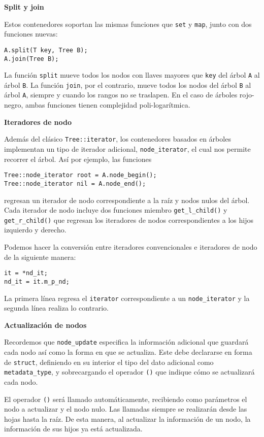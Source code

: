 \documentclass[10pt, letterpaper, twoside]{article}
\begin{document}
\textbf{Split y join}

Estos contenedores soportan las mismas funciones que \texttt{set} y \texttt{map}, junto con dos funciones nuevas: 

\begin{lstlisting}
A.split(T key, Tree B);
A.join(Tree B);
\end{lstlisting}

La función \texttt{split} mueve todos los nodos con llaves mayores que \texttt{key} del árbol \texttt{A} al árbol \texttt{B}. La función \texttt{join}, por el contrario, mueve todos los nodos del árbol \texttt{B} al árbol \texttt{A}, siempre y cuando los rangos no se traslapen. En el caso de árboles rojo-negro, ambas funciones tienen complejidad poli-logarítmica.\medskip

\textbf{Iteradores de nodo}

Además del clásico \texttt{Tree::iterator}, los contenedores basados en árboles implementan un tipo de iterador adicional, \texttt{node\_iterator}, el cual nos permite recorrer el árbol. Así por ejemplo, las funciones
\begin{lstlisting}
Tree::node_iterator root = A.node_begin();
Tree::node_iterator nil = A.node_end();
\end{lstlisting}
regresan un iterador de nodo correspondiente a la raíz y nodos nulos del árbol. Cada iterador de nodo incluye dos funciones miembro \texttt{get\_l\_child()} y \texttt{get\_r\_child()} que regresan los iteradores de nodos correspondientes a los hijos izquierdo y derecho.

Podemos hacer la conversión entre iteradores convencionales e iteradores de nodo de la siguiente manera:
\begin{lstlisting}
it = *nd_it;
nd_it = it.m_p_nd;
\end{lstlisting}
La primera línea regresa el \texttt{iterator} correspondiente a un \texttt{node\_iterator} y la segunda línea realiza lo contrario.\medskip

\textbf{Actualización de nodos}

Recordemos que \texttt{node\_update} especifica la información adicional que guardará cada nodo así como la forma en que se actualiza. Este debe declararse en forma de \texttt{struct}, definiendo en su interior el tipo del dato adicional como \texttt{metadata\_type}, y sobrecargando el operador \texttt{()} que indique cómo se actualizará cada nodo. 

El operador \texttt{()} será llamado automáticamente, recibiendo como parámetros el nodo a actualizar y el nodo nulo. Las llamadas siempre se realizarán desde las hojas hasta la raíz. De esta manera, al actualizar la información de un nodo, la información de sus hijos ya está actualizada.
\end{document}
